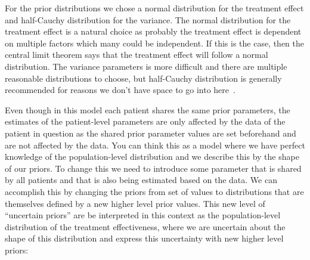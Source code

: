\documentclass[12pt,a4paper,leqno]{report}
\theoremstyle{plain}
\theoremstyle{definition}
\theoremstyle{remark}
\begin{document}

For the prior distributions we chose a normal distribution for the treatment effect and half-Cauchy
distribution for the variance. The
normal distribution for the treatment effect is a natural choice as probably the
treatment effect is dependent on multiple factors which many could be independent. If
this is the case, then the central limit theorem says that the treatment effect will follow a
normal distribution. The variance parameters is more difficult and there are multiple
reasonable distributions to choose, but half-Cauchy distribution is generally
recommended for reasons we don't have space to go into here\ \cite{variancepriors}.


Even though in this model each patient shares the same prior parameters, the estimates of the patient-level parameters
are only affected by the data of the patient in question as the shared prior parameter values are set
beforehand and are not affected by the data. You can think this as a model where we have
perfect knowledge of the population-level distribution and we describe this by the shape
of our priors. To change this we need to introduce
some parameter that is shared by all patients and that is also being estimated based on
the data. We can accomplish this by changing the priors from set of values to distributions
that are themselves defined by a new higher level prior values. This new level of
``uncertain priors'' are be interpreted in this context as the population-level
distribution of the treatment effectiveness, where we are uncertain about the shape of
this distribution and express this uncertainty with new higher level priors:
\end{document}
